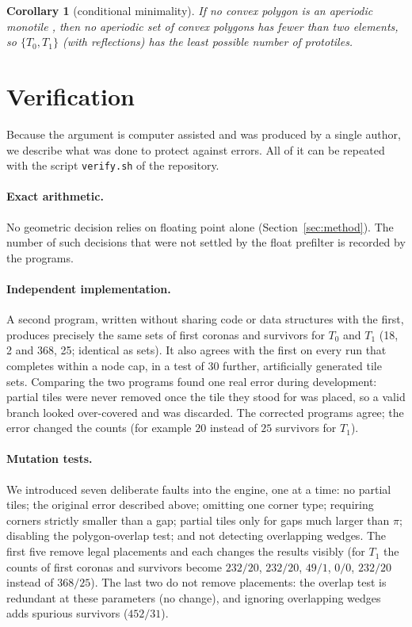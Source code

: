 \documentclass[11pt]{article}
\newtheorem{corollary}[theorem]{Corollary}
\theoremstyle{remark}
\newcommand{\Tz}{T_0}
\newcommand{\To}{T_1}
\begin{document}
\begin{corollary}[conditional minimality]
If no convex polygon is an aperiodic monotile \cite{Rao17}, then no aperiodic set of convex polygons has fewer than two elements, so $\{\Tz,\To\}$ (with reflections) has the least possible number of prototiles.
\end{corollary}

\section{Verification}\label{sec:verif}

Because the argument is computer assisted and was produced by a single author, we describe what was done to protect against errors. All of it can be repeated with the script \texttt{verify.sh} of the repository.

\paragraph{Exact arithmetic.} No geometric decision relies on floating point alone (Section~\ref{sec:method}). The number of such decisions that were not settled by the float prefilter is recorded by the programs.

\paragraph{Independent implementation.} A second program, written without sharing code or data structures with the first, produces precisely the same sets of first coronas and survivors for $\Tz$ and $\To$ (18, 2 and 368, 25; identical as sets). It also agrees with the first on every run that completes within a node cap, in a test of 30 further, artificially generated tile sets. Comparing the two programs found one real error during development: partial tiles were never removed once the tile they stood for was placed, so a valid branch looked over-covered and was discarded. The corrected programs agree; the error changed the counts (for example $20$ instead of $25$ survivors for $\To$).

\paragraph{Mutation tests.} We introduced seven deliberate faults into the engine, one at a time: no partial tiles; the original error described above; omitting one corner type; requiring corners strictly smaller than a gap; partial tiles only for gaps much larger than $\pi$; disabling the polygon-overlap test; and not detecting overlapping wedges. The first five remove legal placements and each changes the results visibly (for $\To$ the counts of first coronas and survivors become $232/20$, $232/20$, $49/1$, $0/0$, $232/20$ instead of $368/25$). The last two do not remove placements: the overlap test is redundant at these parameters (no change), and ignoring overlapping wedges adds spurious survivors ($452/31$).
\end{document}
